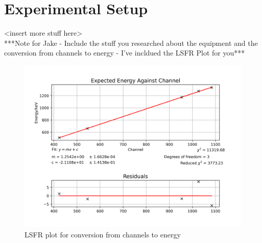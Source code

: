 \documentclass[12pt, a4paper]{article}
\begin{document}
\section{Experimental Setup}
	<insert more stuff here>\\
	***Note for Jake - Include the stuff you researched about the equipment and the conversion from channels to energy - I've incldued the LSFR Plot for you***
	\begin{figure}[H] \centering
		\includegraphics[scale=0.5]{assets/calibration.png}
		\caption{LSFR plot for conversion from channels to energy}
	\end{figure}
\end{document}

